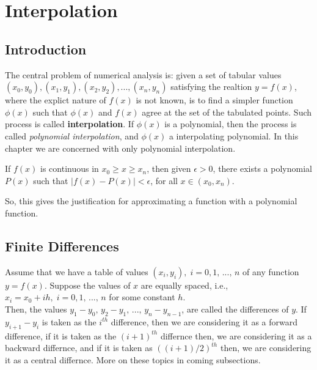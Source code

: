 \documentclass[aima203_lecturenotes_ku.tex]{subfiles}
\begin{document}
\chapter{Interpolation}
\section{Introduction}
The central problem of numerical analysis is: given a set of tabular values \\
$(x_0,y_0), (x_1,y_1),(x_2,y_2),...,(x_n,y_n)$ satisfying the realtion $y=f(x)$, where the explict nature of $f(x)$ is not known, is to find a simpler function $\phi (x)$ such that $\phi (x)$ and $f(x)$ agree at the set of the tabulated points. Such process is called \textbf{interpolation}. If $\phi (x)$ is a polynomial, then the process is called \textit{polynomial interpolation}, and $\phi (x)$ a interpolating polynomial. In this chapter we are concerned with only polynomial interpolation.

\begin{theorem}
If $f(x)$ is continuous in $x_0 \geq x \geq x_n$, then given $\epsilon >0$, there exists a polynomial $P(x)$ such that $|f(x)-P(x)| < \epsilon$, for all $x \in (x_0, x_n)$.
\end{theorem}
So, this gives the justification for approximating a function with a polynomial function.

\section{Finite Differences}
Assume that we have a table of values $(x_i,y_i), \; i=0,1,\, ..., \, n$ of any function $y=f(x)$. Suppose the values of $x$ are equally spaced, i.e., $x_i=x_0 + ih, \; i=0,1,\, ..., \, n$ for some constant $h$. \\
Then, the values $y_1 - y_0, \, y_2 - y_1, \, ..., \, y_n - y_{n-1}$, are called the differences of $y$. If $y_{i+1} - y_i$ is taken as the $i^{th}$ difference, then we are considering it as a forward difference, if it is taken as the $(i+1)^{th}$ differnce then, we are considering it as a backward differnce, and if it is taken as $((i+1)/2)^{th}$ then, we are considering it as a central differnce. More on these topics in coming subsections.
\end{document}
